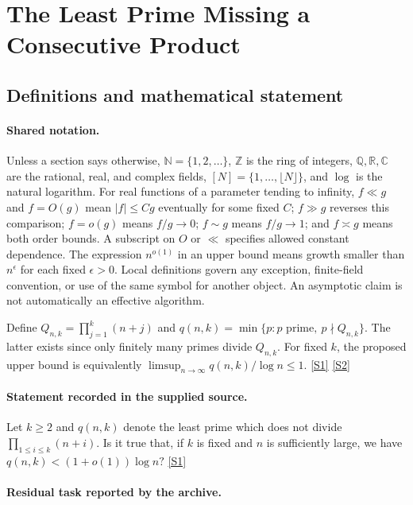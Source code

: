 \documentclass[11pt,a4paper]{article}
\newcommand{\N}{\mathbb{N}}
\newcommand{\Z}{\mathbb{Z}}
\newcommand{\Q}{\mathbb{Q}}
\newcommand{\R}{\mathbb{R}}
\newcommand{\C}{\mathbb{C}}
\newcommand{\sref}[2]{\hyperlink{source:#1:#2}{[S#2]}}
\begin{document}
\section{The Least Prime Missing a Consecutive Product}\label{statement}


\subsection{Definitions and mathematical statement}

\paragraph{Shared notation.}Unless a section says otherwise, $\N=\{1,2,\ldots\}$,
$\Z$ is the ring of integers, $\Q,\R,\C$ are the rational, real, and complex
fields, $[N]=\{1,\ldots,\lfloor N\rfloor\}$, and $\log$ is the natural
logarithm. For real functions of a parameter tending to infinity,
$f\ll g$ and $f=O(g)$ mean $|f|\leq Cg$ eventually for some fixed $C$;
$f\gg g$ reverses this comparison; $f=o(g)$ means $f/g\to0$;
$f\sim g$ means $f/g\to1$; and $f\asymp g$ means both order bounds.
A subscript on $O$ or $\ll$ specifies allowed constant dependence.
The expression $n^{o(1)}$ in an upper bound means growth smaller than
$n^\epsilon$ for each fixed $\epsilon>0$. Local definitions govern any
exception, finite-field convention, or use of the same symbol for another
object. An asymptotic claim is not automatically an effective algorithm.



Define $Q_{n,k}=\prod_{j=1}^{k}(n+j)$ and $q(n,k)=\min\{p:p\text{ prime},\ p\nmid Q_{n,k}\}$. The latter exists since only finitely many primes divide $Q_{n,k}$. For fixed $k$, the proposed upper bound is equivalently $\limsup_{n\to\infty}q(n,k)/\log n\leq1$. \sref{statement}{1} \sref{statement}{2}

\paragraph{Statement recorded in the supplied source.}
Let $k\geq 2$ and $q(n,k)$ denote the least prime which does not divide $\prod_{1\leq i\leq k}(n+i)$. Is it true that, if $k$ is fixed and $n$ is sufficiently large, we have $ q(n,k)<(1+o(1))\log n? $ \sref{statement}{1}

\paragraph{Residual task reported by the archive.}
\end{document}
